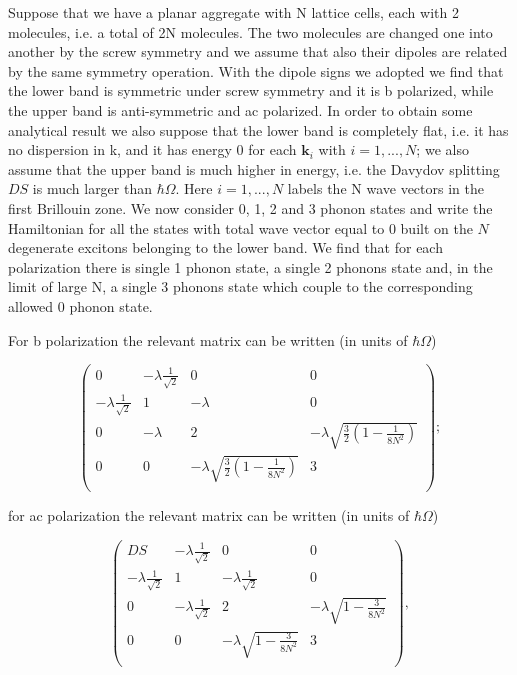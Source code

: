 \documentclass[pt12]{article}
\newcommand{\bfk}{\mathbf{k}}
\begin{document}
Suppose that we have a planar aggregate with N lattice cells, each
with 2 molecules, i.e. a total of 2N molecules. The two molecules
are changed one into another by the screw symmetry and we assume
that also their dipoles are related by the same symmetry operation.
With the dipole signs we adopted we find that the lower band is
symmetric under screw symmetry and it is b polarized, while the
upper band is anti-symmetric and ac polarized. In order to obtain
some analytical result we also suppose that the lower band is
completely flat, i.e. it has no dispersion in k, and it has energy 0
for each $\bfk_i$ with $i=1,...,N$; we also assume that the upper
band is much higher in energy, i.e. the Davydov splitting $DS$ is
much larger than $\hbar\Omega$. Here $i=1,...,N$ labels the N wave
vectors in the first Brillouin zone. We now consider 0, 1, 2 and 3
phonon states and write the Hamiltonian for all the states with
total wave vector equal to 0 built on the $N$ degenerate excitons
belonging to the lower band. We find that for each polarization
there is single 1 phonon state, a single 2 phonons state and, in the
limit of large N, a single 3 phonons state which couple to the
corresponding allowed 0 phonon state.

For b polarization the relevant matrix can be written (in units of
$\hbar\Omega$)

\begin{equation}\label{Matrix_b}
\left(
  \begin{array}{cccc}
    0 & -\lambda\frac{1}{\sqrt{2}} & 0 & 0\\
    -\lambda\frac{1}{\sqrt{2}} & 1 & -\lambda & 0\\
    0 & -\lambda & 2 & -\lambda \sqrt{\frac{3}{2}\left(1-\frac{1}{8N^2}\right)} \\
    0 & 0 & -\lambda \sqrt{\frac{3}{2}\left(1-\frac{1}{8N^2}\right)} & 3 \\
  \end{array}
\right);
\end{equation}

for ac polarization the relevant matrix can be written (in units of
$\hbar\Omega$)

\begin{equation}\label{Matrix_ac}
\left(
  \begin{array}{cccc}
    DS & -\lambda\frac{1}{\sqrt{2}} & 0 & 0 \\
    -\lambda\frac{1}{\sqrt{2}} & 1 & -\lambda\frac{1}{\sqrt{2}} & 0 \\
    0 & -\lambda\frac{1}{\sqrt{2}} & 2 & -\lambda \sqrt{1-\frac{3}{8N^2}} \\
    0 & 0 & -\lambda \sqrt{1-\frac{3}{8N^2}} & 3 \\
  \end{array}
\right),
\end{equation}
\end{document}
